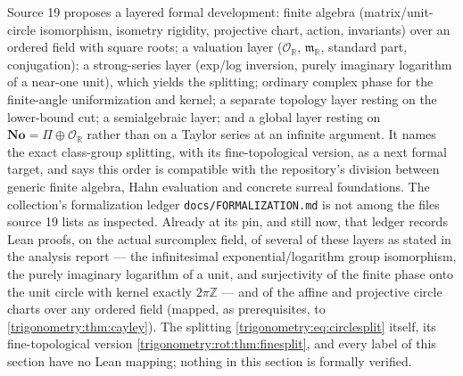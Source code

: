 \documentclass[11pt,letterpaper]{article}
\numberwithin{equation}{section}
\theoremstyle{definition}
\theoremstyle{remark}
\newcommand{\No}{\mathbf{No}}
\newcommand{\R}{\mathbb R}
\newcommand{\Z}{\mathbb Z}
\newcommand{\OO}{\mathcal O}
\newcommand{\mm}{\mathfrak m}
\begin{document}
Source 19 proposes a layered formal development: finite algebra (matrix/unit-circle isomorphism,
isometry rigidity, projective chart, action, invariants) over an ordered field with square roots; a
valuation layer ($\OO_{\R}$, $\mm_{\R}$, standard part, conjugation); a strong-series layer (exp/log
inversion, purely imaginary logarithm of a near-one unit), which yields the splitting; ordinary
complex phase for the finite-angle uniformization and kernel; a separate topology layer resting on
the lower-bound cut; a semialgebraic layer; and a global layer resting on $\No=\Pi\oplus\OO_{\R}$
rather than on a Taylor series at an infinite argument. It names the exact class-group splitting,
with its fine-topological version, as a next formal target, and says this order is compatible with the
repository's division between generic finite algebra, Hahn evaluation and concrete surreal
foundations. The collection's formalization ledger \texttt{docs/FORMALIZATION.md} is not among the
files source 19 lists as inspected. Already at its pin, and still now, that ledger records Lean proofs, on
the actual surcomplex field, of several of these layers as stated in the analysis report --- the
infinitesimal exponential/logarithm group isomorphism, the purely imaginary logarithm of a unit, and
surjectivity of the finite phase onto the unit circle with kernel exactly $2\pi\Z$ --- and of the
affine and projective circle charts over any ordered field (mapped, as prerequisites, to
\cref{trigonometry:thm:cayley}). The splitting \cref{trigonometry:eq:circlesplit} itself, its
fine-topological version \cref{trigonometry:rot:thm:finesplit}, and every label of this section have
no Lean mapping; nothing in this section is formally verified.
\end{document}
